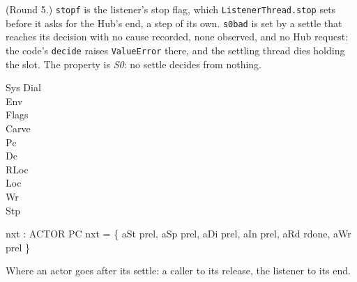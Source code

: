 \documentclass[a4paper,10pt,fleqn]{article}
\begin{document}
(Round 5.)  \texttt{stopf} is the listener's stop flag, which
\texttt{ListenerThread.stop} sets before it asks for the Hub's end, a step of its
own.  \texttt{s0bad} is set by a settle that reaches its decision with no cause
recorded, none observed, and no Hub request: the code's \texttt{decide} raises
\texttt{ValueError} there, and the settling thread dies holding the slot.  The
property is \emph{S0}: no settle decides from nothing.

\begin{schema}{Sys}
  Dial \\ Env \\ Flags \\ Carve \\ Pc \\ Dc \\ RLoc \\ Loc \\ Wr \\ Stp
\end{schema}

\begin{axdef}
  nxt : ACTOR \fun PC
\where
  nxt = \{ aSt \mapsto prel, aSp \mapsto prel, aDi \mapsto prel, aIn \mapsto prel,
    aRd \mapsto rdone, aWr \mapsto prel \}
\end{axdef}

Where an actor goes after its settle: a caller to its release, the listener to
its end.
\end{document}
